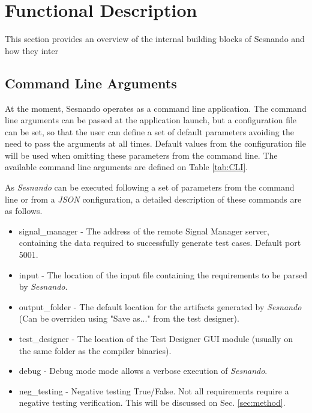 \section{Functional Description}
\label{sec:functional_description}

This section provides an overview of the internal building blocks of Sesnando and how they inter


\subsection{Command Line Arguments}
\label{subsec:command_line_arguments}

At the moment, Sesnando operates as a command line application. The command line arguments can be passed at the application launch, but a configuration file can be set, so that the user can define a set of default parameters avoiding the need to pass the arguments at all times. Default values from the configuration file will be used when omitting these parameters from the command line. The available command line arguments are defined on Table \ref{tab:CLI}.

As \textit{Sesnando} can be executed following a set of parameters from the command line or from a \textit{JSON} configuration, a detailed description of these commands are as follows.

\begin{itemize}
    \item signal\_manager - The address of the remote Signal Manager server, containing the data required to successfully generate test cases. Default port 5001.
    \item input - The location of the input file containing the requirements to be parsed by \textit{Sesnando}.
    \item output\_folder - The default location for the artifacts generated by \textit{Sesnando} (Can be overriden using "Save as..." from the test designer).
    \item test\_designer - The location of the Test Designer GUI module (usually on the same folder as the compiler binaries).
    \item debug - Debug mode mode allows a verbose execution of \textit{Sesnando}.
    \item neg\_testing - Negative testing True/False. Not all requirements require a negative testing verification. This will be discussed on Sec. \ref{sec:method}.
\end{itemize}

